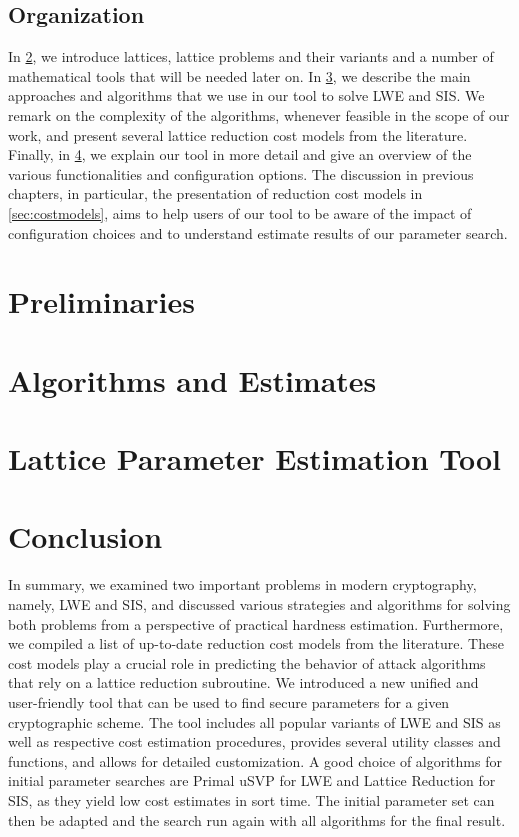 \documentclass[
  a4paper,  %
  twoside,  %
  bibliography=totoc,
  headsepline,
  cleardoublepage=empty,
  parskip=half,
  draft=false
]{scrbook}
\begin{document}
\section{Organization}
In \cref{ch:preliminaries}, we introduce lattices, lattice problems and their variants and a number of mathematical tools that will be needed later on. In \cref{ch:algorithms}, we describe the main approaches and algorithms that we use in our tool to solve LWE and SIS. We remark on the complexity of the algorithms, whenever feasible in the scope of our work, and present several lattice reduction cost models from the literature. Finally, in \cref{ch:tool}, we explain our tool in more detail and give an overview of the various functionalities and configuration options. The discussion in previous chapters, in particular, the presentation of reduction cost models in \cref{sec:costmodels}, aims to help users of our tool to be aware of the impact of configuration choices and to understand estimate results of our parameter search. %

\chapter{Preliminaries} \label{ch:preliminaries}



\chapter{Algorithms and Estimates}\label{ch:algorithms}




\chapter{Lattice Parameter Estimation Tool}\label{ch:tool}



\chapter{Conclusion}
In summary, we examined two important problems in modern cryptography, namely, LWE and SIS, and discussed various strategies and algorithms for solving both problems from a perspective of practical hardness estimation. Furthermore, we compiled a list of up-to-date reduction cost models from the literature. These cost models play a crucial role in predicting the behavior of attack algorithms that rely on a lattice reduction subroutine. We introduced a new unified and user-friendly tool that can be used to find secure parameters for a given cryptographic scheme. The tool includes all popular variants of LWE and SIS as well as respective cost estimation procedures, provides several utility classes and functions, and allows for detailed customization. A good choice of algorithms for initial parameter searches are Primal uSVP for LWE and Lattice Reduction for SIS, as they yield low cost estimates in sort time. The initial parameter set can then be adapted and the search run again with all algorithms for the final result.
\end{document}
